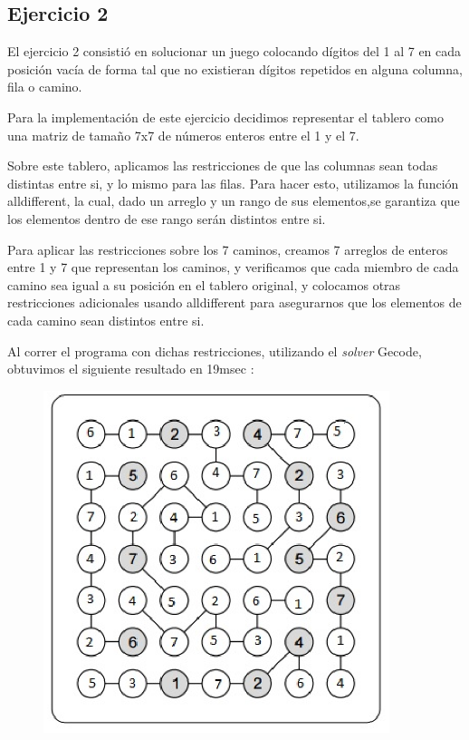 \documentclass{article}
\begin{document}
\subsection{Ejercicio 2}

El ejercicio 2 consistió en solucionar un juego colocando dígitos del 1 al 7 en cada posición vacía de forma tal que no existieran dígitos repetidos en alguna columna, fila o camino.

Para la implementación de este ejercicio decidimos representar el tablero como una matriz de tamaño 7x7 de números enteros entre el 1 y el 7. \par


Sobre este tablero, aplicamos las restricciones de que las columnas sean todas distintas entre si, y lo mismo
para las filas. Para hacer esto, utilizamos la función alldifferent, la cual, dado un arreglo y un rango de sus
elementos,se garantiza que los elementos dentro de ese rango serán distintos entre si. \par


Para aplicar las restricciones sobre los 7 caminos, creamos 7 arreglos de enteros entre 1 y 7 que representan los caminos, y
verificamos que cada miembro de cada camino sea igual a su posición en el tablero original, y colocamos otras restricciones
adicionales usando alldifferent para asegurarnos que los elementos de cada camino sean distintos entre si. \par


Al correr el programa con dichas restricciones, utilizando el \textit{solver} Gecode, obtuvimos el siguiente resultado en 19msec : 

\begin{figure}[!ht]
\begin{center}
\includegraphics[width=0.9\textwidth]{salida2.eps}
\end{center}
\end{figure}
\end{document}
